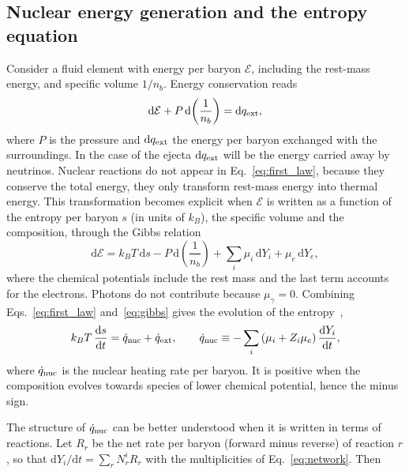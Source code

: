 \subsection{Nuclear energy generation and the entropy equation}\label{sec:entropy_equation}

Consider a fluid element with energy per baryon $\mathcal{E}$, including the rest-mass energy, and specific volume $1/n_b$.
Energy conservation reads~\cite{reichert_nuclear_2023}
\begin{equation}\label{eq:first_law}
  \mathrm{d}\mathcal{E}+P\,\mathrm{d}\!\left(\frac{1}{n_b}\right)=\mathrm{d}q_{\rm ext},
\end{equation}
where $P$ is the pressure and $\mathrm{d}q_{\rm ext}$ the energy per baryon exchanged with the surroundings.
In the case of the ejecta $\mathrm{d}q_{\rm ext}$ will be the energy carried away by neutrinos.
Nuclear reactions do not appear in Eq.~\ref{eq:first_law}, because they conserve the total energy, they only transform rest-mass energy into thermal energy.
This transformation becomes explicit when $\mathcal{E}$ is written as a function of the entropy per baryon $s$ (in units of $k_B$), the specific volume and the composition, through the Gibbs relation
\begin{equation}\label{eq:gibbs}
  \mathrm{d}\mathcal{E}=k_BT\,\mathrm{d}s-P\,\mathrm{d}\!\left(\frac{1}{n_b}\right)+\sum_i\mu_i\,\mathrm{d}Y_i+\mu_e\,\mathrm{d}Y_e,
\end{equation}
where the chemical potentials include the rest mass and the last term accounts for the electrons.
Photons do not contribute because $\mu_\gamma=0$.
Combining Eqs.~\ref{eq:first_law} and~\ref{eq:gibbs} gives the evolution of the entropy~\cite{freiburghaus_r-process_1999,lippuner_skynet_2017,reichert_nuclear_2023},
\begin{equation}\label{eq:entropy_eq}
  k_BT\,\frac{\mathrm{d}s}{\mathrm{d}t}=\dot q_{\rm nuc}+\dot q_{\rm ext},\qquad
  \dot q_{\rm nuc}\equiv-\sum_i\left(\mu_i+Z_i\mu_e\right)\frac{\mathrm{d}Y_i}{\mathrm{d}t},
\end{equation}
where $\dot q_{\rm nuc}$ is the nuclear heating rate per baryon.
It is positive when the composition evolves towards species of lower chemical potential, hence the minus sign.

The structure of $\dot q_{\rm nuc}$ can be better understood when it is written in terms of reactions.
Let $R_r$ be the net rate per baryon (forward minus reverse) of reaction $r$, so that $\mathrm{d}Y_i/\mathrm{d}t=\sum_rN^i_rR_r$ with the multiplicities of Eq.~\ref{eq:network}.
Then

